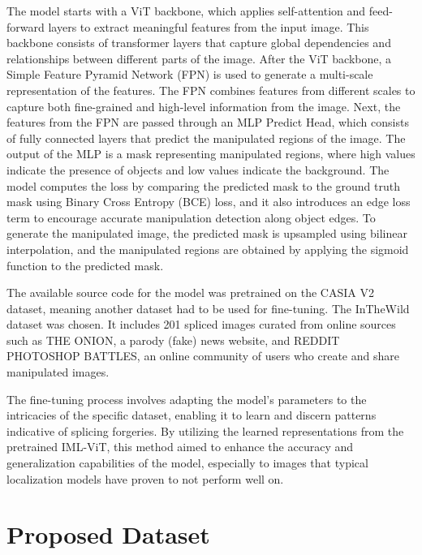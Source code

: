 The model starts with a ViT backbone, which applies self-attention and feed-forward layers to extract meaningful features from the input image. This backbone consists of transformer layers that capture global dependencies and relationships between different parts of the image. After the ViT backbone, a Simple Feature Pyramid Network (FPN) is used to generate a multi-scale representation of the features. The FPN combines features from different scales to capture both fine-grained and high-level information from the image. Next, the features from the FPN are passed through an MLP Predict Head, which consists of fully connected layers that predict the manipulated regions of the image. The output of the MLP is a mask representing manipulated regions, where high values indicate the presence of objects and low values indicate the background. The model computes the loss by comparing the predicted mask to the ground truth mask using Binary Cross Entropy (BCE) loss, and it also introduces an edge loss term to encourage accurate manipulation detection along object edges. To generate the manipulated image, the predicted mask is upsampled using bilinear interpolation, and the manipulated regions are obtained by applying the sigmoid function to the predicted mask.

The available source code for the model was pretrained on the CASIA V2 dataset, meaning another dataset had to be used for fine-tuning. The InTheWild dataset \cite{huh2018fighting} was chosen. It includes 201 spliced images curated from online sources such as THE ONION, a parody (fake) news website, and REDDIT PHOTOSHOP BATTLES, an online community of users who create and share manipulated images.

The fine-tuning process involves adapting the model's parameters to the intricacies of the specific dataset, enabling it to learn and discern patterns indicative of splicing forgeries. By utilizing the learned representations from the pretrained IML-ViT, this method aimed to enhance the accuracy and generalization capabilities of the model, especially to images that typical localization models have proven to not perform well on.

  \section{Proposed Dataset } \label{sec:s3}


